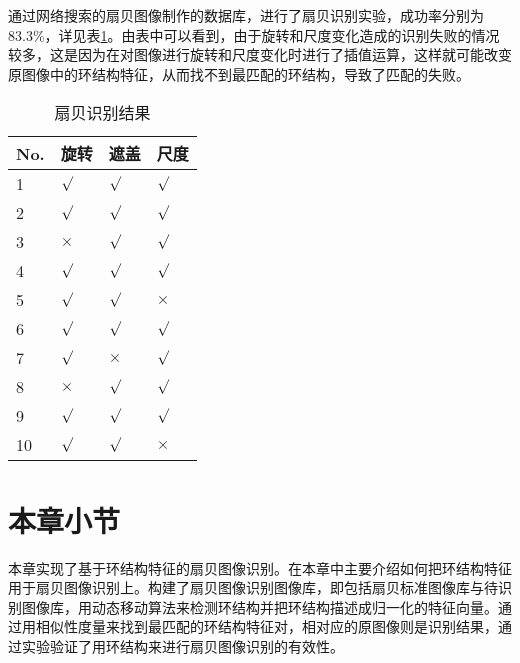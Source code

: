 通过网络搜索的扇贝图像制作的数据库，进行了扇贝识别实验，成功率分别为83.3\%，详见表\ref{tab:recognition}。由表中可以看到，由于旋转和尺度变化造成的识别失败的情况较多，这是因为在对图像进行旋转和尺度变化时进行了插值运算，这样就可能改变原图像中的环结构特征，从而找不到最匹配的环结构，导致了匹配的失败。
\begin{table}
\caption{扇贝识别结果}
\centering
\begin{tabular}{p{1cm}<{\centering}p{1cm}<{\centering}p{1cm}<{\centering}p{1cm}<{\centering}}
  \hline
  No. & 旋转 & 遮盖 & 尺度\\
  \hline
  \rowcolor{gray!50}
  1 & $\surd$  & $\surd$     & $\surd$ \\
  2 & $\surd$  & $\surd$     & $\surd$ \\
  \rowcolor{gray!50}
  3 & $\times$  & $\surd$  & $\surd$\\
  4 & $\surd$  & $\surd$  & $\surd$ \\
  \rowcolor{gray!50}
  5 & $\surd$     & $\surd$     & $\times$\\
  6 & $\surd$      & $\surd$      & $\surd$\\
  \rowcolor{gray!50}
  7 & $\surd$  & $\times$      & $\surd$  \\
  8 & $\times$  & $\surd$  & $\surd$ \\
  \rowcolor{gray!50}
  9 & $\surd$ & $\surd$  & $\surd$\\
  10 & $\surd$  & $\surd$  & $\times$ \\
  \hline
\end{tabular}
\label{tab:recognition}
\end{table}

\section{本章小节}
\label{}
本章实现了基于环结构特征的扇贝图像识别。在本章中主要介绍如何把环结构特征用于扇贝图像识别上。构建了扇贝图像识别图像库，即包括扇贝标准图像库与待识别图像库，用动态移动算法来检测环结构并把环结构描述成归一化的特征向量。通过用相似性度量来找到最匹配的环结构特征对，相对应的原图像则是识别结果，通过实验验证了用环结构来进行扇贝图像识别的有效性。


